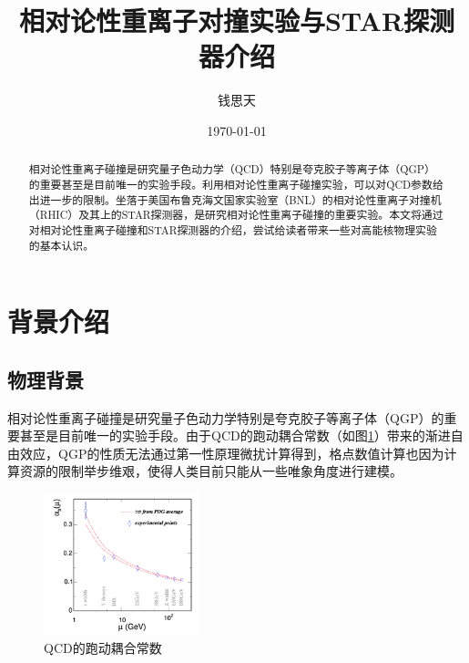 \documentclass[%
 reprint,
 amsmath,amssymb,
 aps,
]{revtex4-1}
\begin{document}

\title{相对论性重离子对撞实验与STAR探测器介绍}%
\author{钱思天}
%


\date{\today}%

\begin{abstract}
相对论性重离子碰撞是研究量子色动力学（QCD）特别是夸克胶子等离子体（QGP）的重要甚至是目前唯一的实验手段。利用相对论性重离子碰撞实验，可以对QCD参数给出进一步的限制。坐落于美国布鲁克海文国家实验室（BNL）的相对论性重离子对撞机（RHIC）及其上的STAR探测器，是研究相对论性重离子碰撞的重要实验。本文将通过对相对论性重离子碰撞和STAR探测器的介绍，尝试给读者带来一些对高能核物理实验的基本认识。
\end{abstract}

\maketitle


\section{\label{sec:bgd}背景介绍}



\subsection{\label{sec:Phybg}物理背景}

相对论性重离子碰撞是研究量子色动力学特别是夸克胶子等离子体（QGP）的重要甚至是目前唯一的实验手段\cite{Ruan:2005hy}\cite{Dong:2005iq}。由于QCD的跑动耦合常数（如图\ref{fig:Running}）带来的渐进自由效应，QGP的性质无法通过第一性原理微扰计算得到，格点数值计算也因为计算资源的限制举步维艰，使得人类目前只能从一些唯象角度进行建模\cite{Qiu:2013wca}。
\begin{figure}[htbp]
    \includegraphics[width = 0.4\textwidth]{Plots/Running.png}
    \caption{\label{fig:Running}QCD的跑动耦合常数}
\end{figure}
\end{document}
